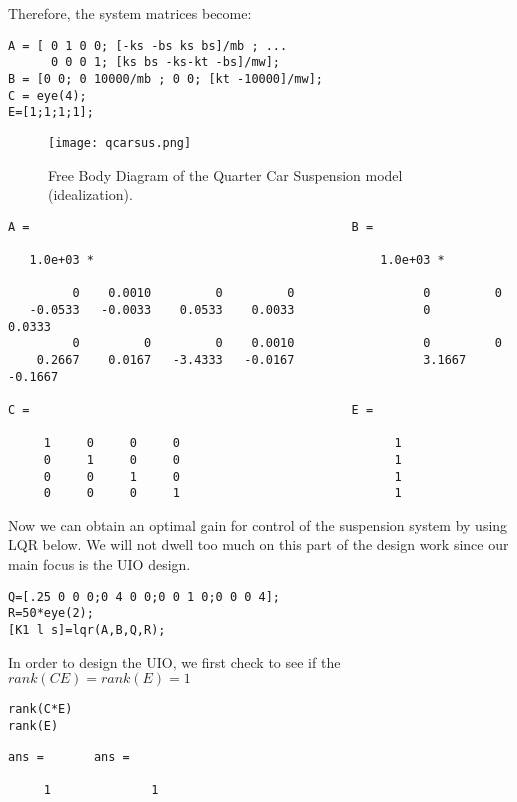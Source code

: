 \documentclass{amsart}
\theoremstyle{definition}
\theoremstyle{remark}
\numberwithin{equation}{section}
\begin{document}
Therefore, the system matrices become:

\begin{verbatim}
A = [ 0 1 0 0; [-ks -bs ks bs]/mb ; ...
      0 0 0 1; [ks bs -ks-kt -bs]/mw];
B = [0 0; 0 10000/mb ; 0 0; [kt -10000]/mw];
C = eye(4);
E=[1;1;1;1];
\end{verbatim}
 
\begin{figure}[H]
    \centering
    \texttt{[image: qcarsus.png]}
    \caption{Free Body Diagram of the Quarter Car Suspension model (idealization).}
    \label{fig:car_sus_fbd}
\end{figure}

\color{lightgray} \begin{verbatim}
A =                                             B = 

   1.0e+03 *                                        1.0e+03 *

         0    0.0010         0         0                  0         0
   -0.0533   -0.0033    0.0533    0.0033                  0         0.0333
         0         0         0    0.0010                  0         0
    0.2667    0.0167   -3.4333   -0.0167                  3.1667   -0.1667

C =                                             E = 

     1     0     0     0                              1
     0     1     0     0                              1
     0     0     1     0                              1
     0     0     0     1                              1

\end{verbatim} \color{black}
Now we can obtain an optimal gain for control of the suspension system by using LQR below.  We will not dwell too much on this part of the design work since our main focus is the UIO design.  

\begin{verbatim}
Q=[.25 0 0 0;0 4 0 0;0 0 1 0;0 0 0 4];
R=50*eye(2);
[K1 l s]=lqr(A,B,Q,R);
\end{verbatim}

In order to design the UIO, we first check to see if the $rank(CE) = rank(E) = 1$
\vspace{1em}
\begin{verbatim}
rank(C*E)
rank(E)
\end{verbatim}

        \color{lightgray} \begin{verbatim}
ans =       ans =

     1              1
\end{verbatim} \color{black}
    
\end{document}
